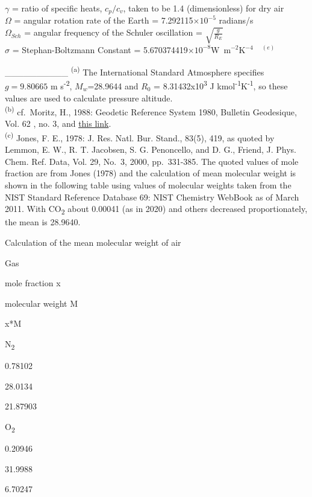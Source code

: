 \documentclass[
  english,
]{book}
\begin{document}
\(\gamma\) = ratio of specific
heats, \(c_{p}/c_{v}\), taken to be
1.4 (dimensionless) for dry air\\
\(\Omega\) = angular rotation rate of the
Earth = 7.292115\(\times10^{-5}\)
radians/s\\
\(\Omega_{Sch}\) = angular frequency of the Schuler
oscillation = \(\sqrt{\frac{g}{R_{E}}}\)\\
\(\sigma\) = Stephan-Boltzmann
Constant =
5.670374419\(\times10^{-8}\)W~m\(^{-2}\)K\(^{-4}\)~~\(^{(e)}\)

\_\_\_\_\_\_\_\_\_\_ \textsuperscript{(a)} The International Standard
Atmosphere specifies \(g=9.80665\) m s\textsuperscript{-2},
\(M_{w}\)=28.9644 and \(R_{0}\) = 8.31432x10\textsuperscript{3} J
kmol\textsuperscript{-1}K\textsuperscript{-1}, so these values are used
to calculate pressure altitude.\\
\textsuperscript{(b)} cf.~Moritz, H., 1988: Geodetic Reference System
1980, Bulletin Geodesique, Vol. 62 , no. 3, and
\href{http://earth-info.nga.mil/GandG/publications/tr8350.2/wgs84fin.pdf}{this
link}.\\
\textsuperscript{(c)} Jones, F. E., 1978: J. Res. Natl. Bur. Stand.,
83(5), 419, as quoted by Lemmon, E. W., R. T. Jacobsen, S. G.
Penoncello, and D. G., Friend, J. Phys. Chem. Ref. Data, Vol. 29, No.~3,
2000, pp.~331-385. The quoted values of mole fraction are from Jones
(1978) and the calculation of mean molecular weight is shown in the
following table using values of molecular weights taken from the NIST
Standard Reference Database 69: NIST Chemistry WebBook as of March 2011.
With CO\textsubscript{2} about 0.00041 (as in 2020) and others decreased
proportionately, the mean is 28.9640.

Calculation of the mean molecular weight of air

Gas

mole fraction x

molecular weight M

x*M

N\textsubscript{2}

0.78102

28.0134

21.87903

O\textsubscript{2}

0.20946

31.9988

6.70247
\end{document}
